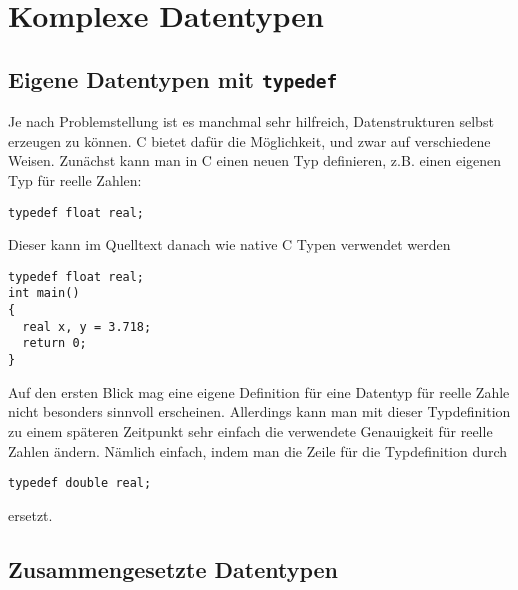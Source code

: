 \section{Komplexe Datentypen}

\subsection{Eigene Datentypen mit \texttt{typedef}}

Je nach Problemstellung ist es manchmal sehr hilfreich, Datenstrukturen selbst erzeugen zu können.
C bietet dafür die Möglichkeit, und zwar auf verschiedene Weisen.
Zunächst kann man in C einen neuen Typ definieren, z.B. einen eigenen Typ für reelle Zahlen:
\begin{lstlisting}
typedef float real;
\end{lstlisting}
Dieser kann im Quelltext danach wie native C Typen verwendet werden
\begin{lstlisting}
typedef float real;
int main()
{
  real x, y = 3.718;
  return 0;
}
\end{lstlisting}
Auf den ersten Blick mag eine eigene Definition für eine Datentyp für reelle Zahle nicht besonders sinnvoll erscheinen.
Allerdings kann man mit dieser Typdefinition zu einem späteren Zeitpunkt sehr einfach die verwendete Genauigkeit für reelle Zahlen ändern.
Nämlich einfach, indem man die Zeile für die Typdefinition durch
\begin{lstlisting}
typedef double real;
\end{lstlisting}
ersetzt.

\subsection{Zusammengesetzte Datentypen}

